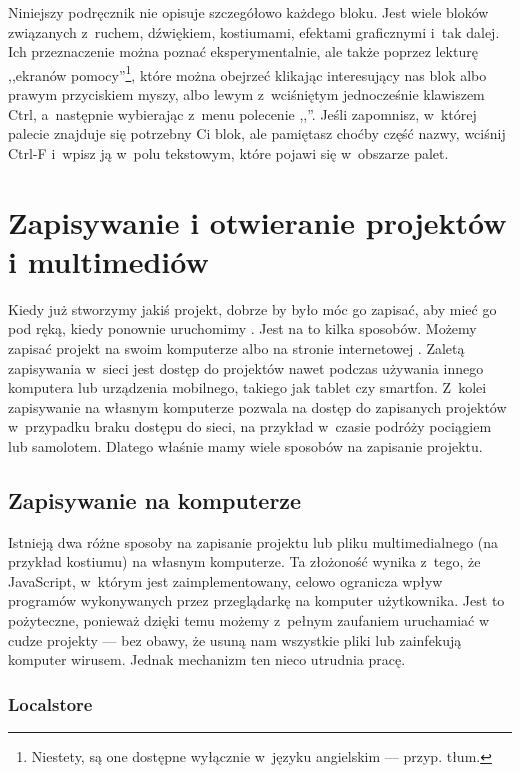 \documentclass[a4paper]{report}
\begin{document}
Niniejszy podręcznik nie opisuje szczegółowo każdego bloku. Jest wiele bloków związanych z~ruchem, dźwiękiem, kostiumami, efektami graficznymi i~tak dalej. Ich przeznaczenie można poznać eksperymentalnie, ale także poprzez lekturę ,,ekranów pomocy''\footnote{Niestety, są one dostępne wyłącznie w~języku angielskim --- przyp. tłum.}, które można obejrzeć klikając interesujący nas blok albo prawym przyciskiem myszy, albo lewym z~wciśniętym jednocześnie klawiszem Ctrl, a~następnie wybierając z~menu polecenie ,,''. Jeśli zapomnisz, w~której palecie znajduje się potrzebny Ci blok, ale pamiętasz choćby część nazwy, wciśnij Ctrl-F i~wpisz ją w~polu tekstowym, które pojawi się w~obszarze palet.

\chapter{Zapisywanie i otwieranie projektów i multimediów}

Kiedy już stworzymy jakiś projekt, dobrze by było móc go zapisać, aby mieć go pod ręką, kiedy ponownie uruchomimy . Jest na to kilka sposobów. Możemy zapisać projekt na swoim komputerze albo na stronie internetowej . Zaletą zapisywania w~sieci jest dostęp do projektów nawet podczas używania innego komputera lub urządzenia mobilnego, takiego jak tablet czy smartfon. Z~kolei zapisywanie na własnym komputerze pozwala na dostęp do zapisanych projektów w~przypadku braku dostępu do sieci, na przykład w~czasie podróży pociągiem lub samolotem. Dlatego właśnie mamy wiele sposobów na zapisanie projektu.

\section{Zapisywanie na komputerze}

Istnieją dwa różne sposoby na zapisanie projektu lub pliku multimedialnego (na przykład kostiumu) na własnym komputerze. Ta złożoność wynika z~tego, że JavaScript, w~którym \Snap{} jest zaimplementowany, celowo ogranicza wpływ programów wykonywanych przez przeglądarkę na komputer użytkownika. Jest to pożyteczne, ponieważ dzięki temu możemy z~pełnym zaufaniem uruchamiać w~ cudze projekty --- bez obawy, że usuną nam wszystkie pliki lub zainfekują komputer wirusem. Jednak mechanizm ten nieco utrudnia pracę.

\subsection{Localstore}
\end{document}
